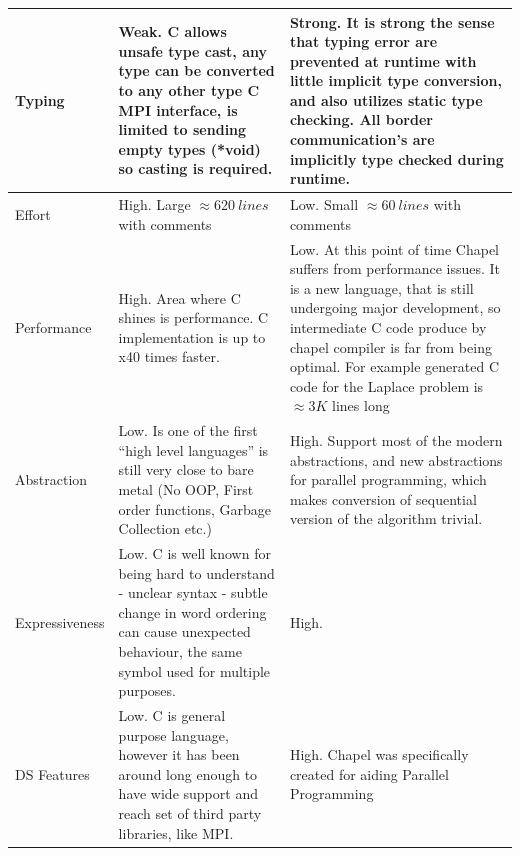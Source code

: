 \documentclass{article}
\begin{document}
\begin{centering}
\begin{table}[h!]
\begin{tabular}{l| p{7.5cm} | p{7.5cm}}
                    \\ \hline
              Typing 
                  & Weak. C allows unsafe type cast, any type can be converted to any
                  other type  C MPI interface, is limited to sending empty types (*void) so
                  casting is required.
                  & Strong. It is strong the sense that typing error are prevented at runtime with
                  little implicit type conversion, and also utilizes static type checking.
                  All border communication's are implicitly type checked during runtime. 
                  \\ \hline
              Effort     
                  &  High.  
                    Large $\approx 620\ lines$ with comments
                    &  Low.
                    Small $\approx 60\ lines$ with comments
                \\ \hline
              Performance   
                & High. Area where C shines is performance. C implementation is up to x40 times
                faster.
                & Low. At this point of time Chapel suffers from performance issues. It is a new
                language, that is still undergoing major development, so intermediate C code produce by chapel
                compiler is far from being optimal. For example generated C code for the
                Laplace problem is $\approx 3K$ lines long \\ 
                \hline
              Abstraction 
                    & Low. Is one of the first ``high level languages'' is still very
                    close to bare metal (No OOP, First order functions, Garbage Collection etc.) 
                    & High. Support most of the modern abstractions, and new abstractions for
                    parallel programming, which makes conversion of sequential version of the
                    algorithm trivial.
                    \\ \hline
              Expressiveness 
                  & Low. C is well known for being hard to understand - unclear
                  syntax - subtle change in word ordering can cause unexpected behaviour, the
                  same symbol used for multiple purposes.
                  &  High. 
                  \\ \hline
              DS Features 
                  & Low. C is general purpose language, however it has been around
                  long enough to have wide support and reach set of third party libraries,
                  like MPI.
                  & High. Chapel was specifically created for aiding Parallel Programming

\end{tabular}
\end{table}
\end{centering}
\end{document}
